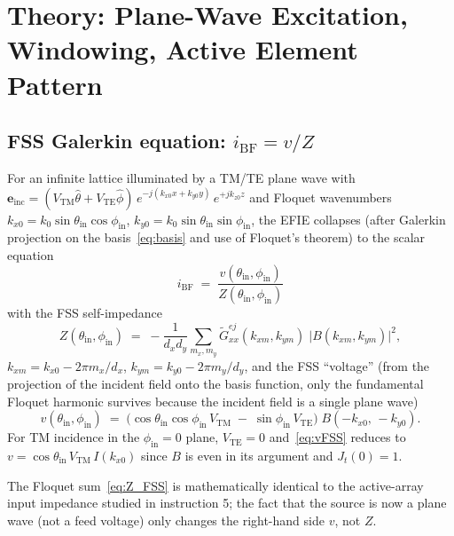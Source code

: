 \documentclass{article}
\begin{document}
\section{Theory: Plane-Wave Excitation, Windowing, Active Element Pattern}

\subsection{FSS Galerkin equation: $i_{\text{BF}} = v/Z$}

For an infinite lattice illuminated by a TM/TE plane wave with $\boldsymbol{e}_{\text{inc}} = (V_{\text{TM}}\hat{\theta} + V_{\text{TE}}\hat{\phi})\,e^{-j(k_{x0}x + k_{y0}y)}\,e^{+jk_{z0}z}$ and Floquet wavenumbers $k_{x0} = k_0\sin\theta_{\text{in}}\cos\phi_{\text{in}}$, $k_{y0} = k_0\sin\theta_{\text{in}}\sin\phi_{\text{in}}$, the EFIE collapses (after Galerkin projection on the basis~\eqref{eq:basis} and use of Floquet's theorem) to the scalar equation
\begin{equation}\label{eq:iBF}
\boxed{\;i_{\text{BF}} \;=\; \frac{v(\theta_{\text{in}},\phi_{\text{in}})}{Z(\theta_{\text{in}},\phi_{\text{in}})}\;}
\end{equation}
with the FSS self-impedance
\begin{equation}\label{eq:Z_FSS}
Z(\theta_{\text{in}},\phi_{\text{in}}) \;=\; -\frac{1}{d_x d_y}\sum_{m_x,m_y}\widetilde{G}_{xx}^{ej}(k_{xm},k_{ym})\;\big|B(k_{xm},k_{ym})\big|^2,
\end{equation}
$k_{xm} = k_{x0} - 2\pi m_x/d_x$, $k_{ym} = k_{y0} - 2\pi m_y/d_y$, and the FSS ``voltage'' (from the projection of the incident field onto the basis function, only the fundamental Floquet harmonic survives because the incident field is a single plane wave)
\begin{equation}\label{eq:vFSS}
v(\theta_{\text{in}},\phi_{\text{in}}) \;=\; \big(\cos\theta_{\text{in}}\cos\phi_{\text{in}}\,V_{\text{TM}} \;-\; \sin\phi_{\text{in}}\,V_{\text{TE}}\big)\;B(-k_{x0},\,-k_{y0}).
\end{equation}
For TM incidence in the $\phi_{\text{in}} = 0$ plane, $V_{\text{TE}} = 0$ and~\eqref{eq:vFSS} reduces to $v = \cos\theta_{\text{in}}\,V_{\text{TM}}\,I(k_{x0})$ since $B$ is even in its argument and $J_t(0)=1$.

The Floquet sum~\eqref{eq:Z_FSS} is mathematically identical to the active-array input impedance studied in instruction 5; the fact that the source is now a plane wave (not a feed voltage) only changes the right-hand side $v$, not $Z$.
\end{document}
